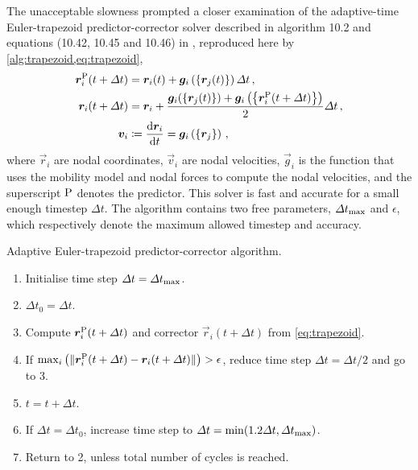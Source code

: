 The unacceptable slowness prompted a closer examination of the adaptive-time Euler-trapezoid predictor-corrector solver described in algorithm 10.2 and equations (10.42, 10.45 and 10.46) in \cite[p.~214--216]{ddlab}, reproduced here by \cref{alg:trapezoid,eq:trapezoid},
\begin{align}\label{eq:trapezoid}
    \vec{r}_i^{\rvar{P}}(t + \Delta t) & = \vec{r}_i(t) + \vec{g}_i\left(\left\{ \vec{r}_j(t) \right\}\right) \Delta t\,,                                                                     \\
    \vec{r}_i(t + \Delta t)            & = \vec{r}_i + \dfrac{\vec{g}_i(\left\{\vec{r}_j(t)\right\}) + \vec{g}_i\left(\left\{\vec{r}_i^{\rvar{P}}(t + \Delta t)\right\}\right)}{2}\Delta t\,, \\
    \vec{v}_i                          & \coloneqq \dfrac{\rvar{d}\vec{r}_i}{\rvar{d}t} = \vec{g}_i\left(\left\{\vec{r}_j\right\}\right)\,,
\end{align}
where $\vec{r}_i$ are nodal coordinates, $\vec{v}_i$ are nodal velocities, $\vec{g}_i$ is the function that uses the mobility model and nodal forces to compute the nodal velocities, and the superscript $\textrm{P}$ denotes the predictor. This solver is fast and accurate for a small enough timestep $\Delta t$. The algorithm contains two free parameters, $\Delta t_{\textrm{max}}$ and $\epsilon$, which respectively denote the maximum allowed timestep and accuracy.
\begin{algorithm}
    \caption{Adaptive Euler-trapezoid predictor-corrector algorithm.}
    \label{alg:trapezoid}
    \begin{enumerate}
        \item Initialise time step $\Delta t = \Delta t_{\textrm{max}}$.
        \item $\Delta t_0 = \Delta t$.
        \item Compute $\vec{r}_i^{\rvar{P}}(t + \Delta t)$ and corrector $\vec{r}_i(t + \Delta t)$ from \cref{eq:trapezoid}.
        \item If $\max_i\left(\lVert \vec{r}_i^{\rvar{P}}(t + \Delta t) - \vec{r}_i(t + \Delta t)\rVert\right) > \epsilon$, reduce time step $\Delta t = \Delta t / 2$ and go to 3.
        \item $t = t + \Delta t$.
        \item If $\Delta t = \Delta t_0$, increase time step to $\Delta t = \min(1.2 \Delta t, \Delta t_{\textrm{max}})$.
        \item Return to 2, unless total number of cycles is reached.
    \end{enumerate}
\end{algorithm}

